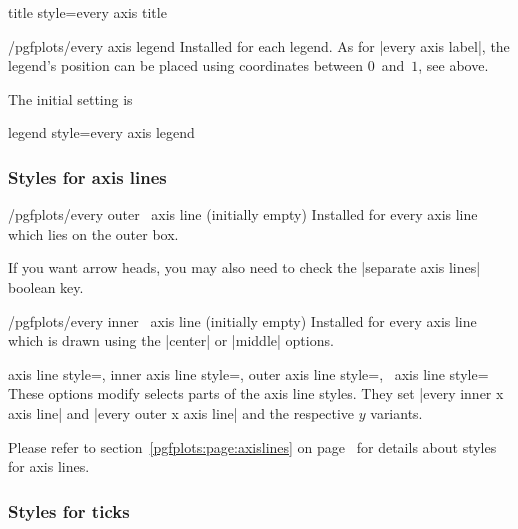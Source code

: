 \pgfplotsshortstylekey title style=every axis title\pgfeov

\begin{stylekey}{/pgfplots/every axis legend}
 Installed for each legend. As for |every axis label|, the legend's position can be placed using coordinates between $0$~and~$1$, see above.

 The initial setting is
\begin{codeexample}
\end{codeexample}
\end{stylekey}

\pgfplotsshortstylekey legend style=every axis legend\pgfeov

\subsubsection*{Styles for axis lines}
\begin{xystylekey}{/pgfplots/every outer \x\ axis line (initially empty)}
	Installed for every axis line which lies on the outer box.

	If you want arrow heads, you may also need to check the |separate axis lines| boolean key.
\end{xystylekey}

\begin{xystylekey}{/pgfplots/every inner \x\ axis line (initially empty)}
	Installed for every axis line which is drawn using the |center| or |middle| options.
\end{xystylekey}

\begin{pgfplotsxykeylist}{%
	axis line style=,
	inner axis line style=,
	outer axis line style=,
	\x\ axis line style=}
	These options modify selects parts of the axis line styles. They set |every inner x axis line| and |every outer x axis line| and the respective $y$ variants.
\end{pgfplotsxykeylist}

\noindent
Please refer to section~\ref{pgfplots:page:axislines} on page~\pageref{pgfplots:page:axislines} for details about styles for axis lines.



\subsubsection*{Styles for ticks}

